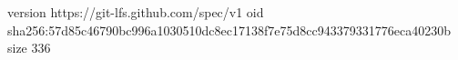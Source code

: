 version https://git-lfs.github.com/spec/v1
oid sha256:57d85c46790bc996a1030510dc8ec17138f7e75d8cc943379331776eca40230b
size 336
